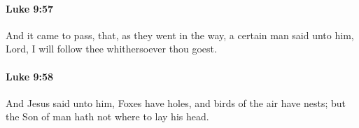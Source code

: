		\paragraph{Luke 9:57} %
			\label{LUKE-9-57}

			And it came to pass, that, as they went in the way, a certain man said unto him, Lord, I will follow thee whithersoever thou goest.

			\begin{framed}
			\scriptsize
				\begin{compactdesc}
					\item[SBLG] 
				\end{compactdesc}
			\end{framed}

		\paragraph{Luke 9:58} %
			\label{LUKE-9-58}

			And Jesus said unto him, Foxes have holes, and birds of the air have nests; but the Son of man hath not where to lay his head.

